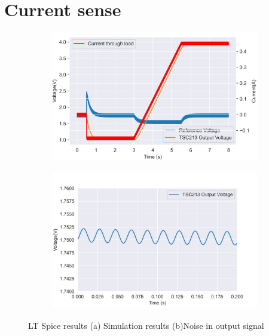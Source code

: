 \section{Current sense}


 \begin{figure}[!htb]
 \footnotesize
 \centering
    \begin{subfigure}[]{0.48\textwidth}
              \centering
  		\includegraphics[width=1\linewidth]{./Figures/circuit.png}
		    \caption{} \label{subfig:sim}
     \end{subfigure}
     \begin{subfigure}[]{0.5\textwidth}
             \centering
  		\includegraphics[width=1\linewidth]{./Figures/noise.png}
		   \caption{ } \label{subfig:noise}
     \end{subfigure}
   \caption[{Current Sense LTSpice Results}]{LT Spice results   (a)  Simulation results (b)Noise in output signal }
 
 \end{figure}

